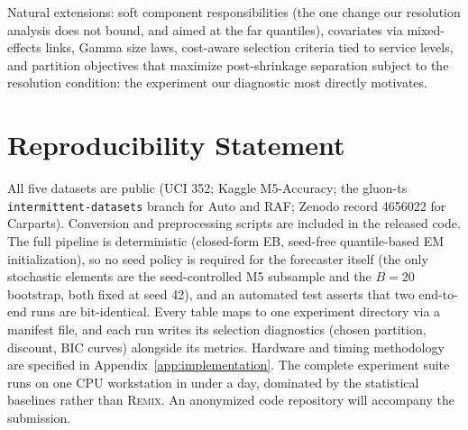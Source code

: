 \documentclass[twocolumn,10pt]{article}
\newcommand{\REMIX}{\textsc{Remix}}
\begin{document}
Natural extensions: soft component responsibilities (the one change our
resolution analysis does not bound, and aimed at the far quantiles),
covariates via mixed-effects links, Gamma size laws, cost-aware
selection criteria tied to service levels, and partition objectives
that maximize post-shrinkage separation subject to the resolution
condition: the experiment our diagnostic most directly motivates.

\section*{Reproducibility Statement}
All five datasets are public (UCI 352; Kaggle M5-Accuracy; the gluon-ts
\texttt{intermittent-datasets} branch for Auto and RAF; Zenodo record
4656022 for Carparts). Conversion and preprocessing scripts are included
in the released code. The full pipeline is deterministic (closed-form
EB, seed-free quantile-based EM initialization), so no seed policy is
required for the forecaster itself (the only stochastic elements are the
seed-controlled M5 subsample and the $B{=}20$ bootstrap, both fixed at
seed 42), and an automated test asserts that two end-to-end runs are
bit-identical. Every table maps to one experiment directory via a
manifest file, and each run writes its selection diagnostics (chosen
partition, discount, BIC curves) alongside its metrics. Hardware and
timing methodology are specified in Appendix~\ref{app:implementation}.
The complete experiment suite runs on one CPU workstation in under a
day, dominated by the statistical baselines rather than \REMIX{}. An
anonymized code repository will accompany the submission.
\end{document}
